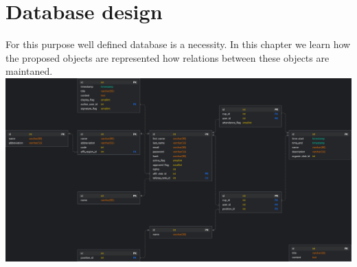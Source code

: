 \section{Database design}
For this purpose well defined database is a necessity. In this chapter we learn how the proposed objects are represented how relations between these objects are maintaned.
\newline
\includegraphics[scale=0.2175]{img/swimmpair_db_schema.png}
\newline

